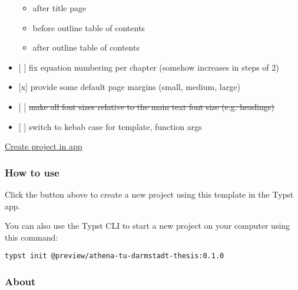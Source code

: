 \begin{itemize}
  \begin{itemize}
  \tightlist
  \item
    after title page
  \item
    before outline table of contents
  \item
    after outline table of contents
  \end{itemize}
\item
  {[} {]} fix equation numbering per chapter (somehow increases in steps
  of 2)
\item
  {[}x{]} provide some default page margins (small, medium, large)
\item
  {[} {]} \st{make all font sizes relative to the main text font size
  (e.g. headings)}
\item
  {[} {]} switch to kebab case for template, function args
\end{itemize}

\href{/app?template=athena-tu-darmstadt-thesis&version=0.1.0}{Create
project in app}

\subsubsection{How to use}\label{how-to-use}

Click the button above to create a new project using this template in
the Typst app.

You can also use the Typst CLI to start a new project on your computer
using this command:

\begin{verbatim}
typst init @preview/athena-tu-darmstadt-thesis:0.1.0
\end{verbatim}



\subsubsection{About}\label{about}

